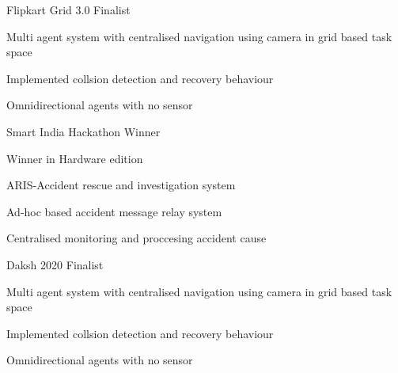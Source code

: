 
\begin{cventries}
  \cventry
    {} %
    {Flipkart Grid 3.0} %
    {Finalist} %
    {} %
    {
      \begin{cvitems} %
        \item {Multi agent system with centralised navigation using camera in grid based task space}
        \item {Implemented collsion detection and recovery behaviour}
        \item {Omnidirectional agents with no sensor}
      \end{cvitems}
    }
  \cventry
    {} %
    {Smart India Hackathon} %
    {Winner} %
    {} %
    {
      \begin{cvitems} %
      	\item {Winner in Hardware edition}
        \item {ARIS-Accident rescue and investigation system}
        \item {Ad-hoc based accident message relay system}
        \item {Centralised monitoring and proccesing accident cause}
      \end{cvitems}
    }
  \cventry
    {} %
    {Daksh 2020} %
    {Finalist} %
    {} %
    {
      \begin{cvitems} %
        \item {Multi agent system with centralised navigation using camera in grid based task space}
        \item {Implemented collsion detection and recovery behaviour}
        \item {Omnidirectional agents with no sensor}
      \end{cvitems}
    }
\end{cventries}
